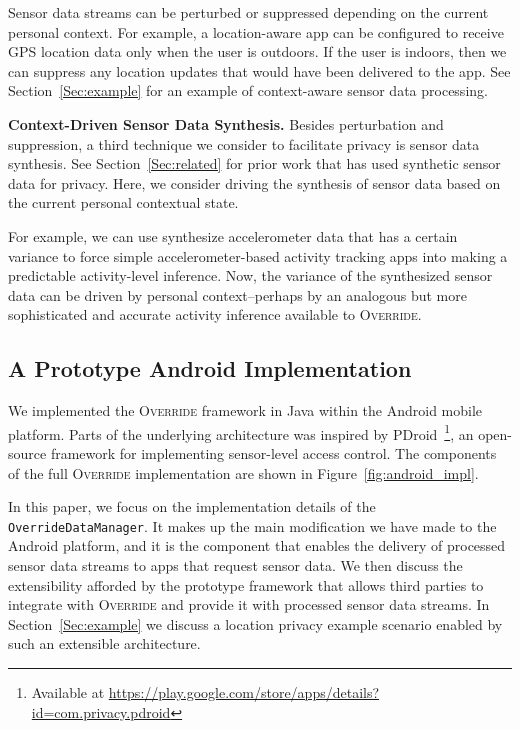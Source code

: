 \documentclass[10pt]{sensys-proc}
\begin{document}
Sensor data streams can be perturbed or suppressed depending on the current personal context. For example, a location-aware app can be configured to receive GPS location data only when the user is outdoors. If the user is indoors, then we can suppress any location updates that would have been delivered to the app. See Section~\ref{Sec:example} for an example of context-aware sensor data processing.

\textbf{Context-Driven Sensor Data Synthesis.} Besides perturbation and suppression, a third technique we consider to facilitate privacy is sensor data synthesis. See Section~\ref{Sec:related} for prior work that has used synthetic sensor data for privacy. Here, we consider driving the synthesis of sensor data based on the current personal contextual state.

For example, we can use synthesize accelerometer data that has a certain variance to force simple  accelerometer-based activity tracking apps into making a predictable activity-level inference. Now, the variance of the synthesized sensor data can be driven by personal context--perhaps by an analogous but more sophisticated and accurate activity inference available to \textsc{Override}.

\subsection{A Prototype Android Implementation}
\label{sec:implementation}
We implemented the \textsc{Override} framework in Java within the Android mobile platform. Parts of the underlying architecture was inspired by PDroid~\footnote{Available at \url{https://play.google.com/store/apps/details?id=com.privacy.pdroid}}, an open-source framework for implementing sensor-level access control. The components of the full \textsc{Override} implementation are shown in Figure~\ref{fig:android_impl}.

In this paper, we focus on the implementation details of the \texttt{OverrideDataManager}. It makes up the main modification we have made to the Android platform, and it is the component that enables the delivery of processed sensor data streams to apps that request sensor data. We then discuss the extensibility afforded by the prototype framework that allows third parties to integrate with \textsc{Override} and provide it with processed sensor data streams. In Section~\ref{Sec:example} we discuss a location privacy example scenario enabled by such an extensible architecture.
\end{document}

